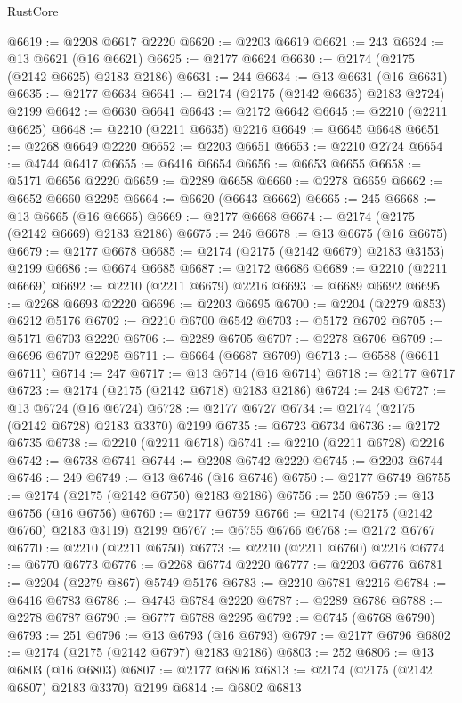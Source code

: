\begin{lexlean}{RustCore}
\begin{coremodule}
@6619 := @2208 @6617 @2220
@6620 := @2203 @6619
@6621 := 243
@6624 := @13 @6621 (@16 @6621)
@6625 := @2177 @6624
@6630 := @2174 (@2175 (@2142 @6625) @2183 @2186)
@6631 := 244
@6634 := @13 @6631 (@16 @6631)
@6635 := @2177 @6634
@6641 := @2174 (@2175 (@2142 @6635) @2183 @2724) @2199
@6642 := @6630 @6641
@6643 := @2172 @6642
@6645 := @2210 (@2211 @6625)
@6648 := @2210 (@2211 @6635) @2216
@6649 := @6645 @6648
@6651 := @2268 @6649 @2220
@6652 := @2203 @6651
@6653 := @2210 @2724
@6654 := @4744 @6417
@6655 := @6416 @6654
@6656 := @6653 @6655
@6658 := @5171 @6656 @2220
@6659 := @2289 @6658
@6660 := @2278 @6659
@6662 := @6652 @6660 @2295
@6664 := @6620 (@6643 @6662)
@6665 := 245
@6668 := @13 @6665 (@16 @6665)
@6669 := @2177 @6668
@6674 := @2174 (@2175 (@2142 @6669) @2183 @2186)
@6675 := 246
@6678 := @13 @6675 (@16 @6675)
@6679 := @2177 @6678
@6685 := @2174 (@2175 (@2142 @6679) @2183 @3153) @2199
@6686 := @6674 @6685
@6687 := @2172 @6686
@6689 := @2210 (@2211 @6669)
@6692 := @2210 (@2211 @6679) @2216
@6693 := @6689 @6692
@6695 := @2268 @6693 @2220
@6696 := @2203 @6695
@6700 := @2204 (@2279 @853) @6212 @5176
@6702 := @2210 @6700 @6542
@6703 := @5172 @6702
@6705 := @5171 @6703 @2220
@6706 := @2289 @6705
@6707 := @2278 @6706
@6709 := @6696 @6707 @2295
@6711 := @6664 (@6687 @6709)
@6713 := @6588 (@6611 @6711)
@6714 := 247
@6717 := @13 @6714 (@16 @6714)
@6718 := @2177 @6717
@6723 := @2174 (@2175 (@2142 @6718) @2183 @2186)
@6724 := 248
@6727 := @13 @6724 (@16 @6724)
@6728 := @2177 @6727
@6734 := @2174 (@2175 (@2142 @6728) @2183 @3370) @2199
@6735 := @6723 @6734
@6736 := @2172 @6735
@6738 := @2210 (@2211 @6718)
@6741 := @2210 (@2211 @6728) @2216
@6742 := @6738 @6741
@6744 := @2208 @6742 @2220
@6745 := @2203 @6744
@6746 := 249
@6749 := @13 @6746 (@16 @6746)
@6750 := @2177 @6749
@6755 := @2174 (@2175 (@2142 @6750) @2183 @2186)
@6756 := 250
@6759 := @13 @6756 (@16 @6756)
@6760 := @2177 @6759
@6766 := @2174 (@2175 (@2142 @6760) @2183 @3119) @2199
@6767 := @6755 @6766
@6768 := @2172 @6767
@6770 := @2210 (@2211 @6750)
@6773 := @2210 (@2211 @6760) @2216
@6774 := @6770 @6773
@6776 := @2268 @6774 @2220
@6777 := @2203 @6776
@6781 := @2204 (@2279 @867) @5749 @5176
@6783 := @2210 @6781 @2216
@6784 := @6416 @6783
@6786 := @4743 @6784 @2220
@6787 := @2289 @6786
@6788 := @2278 @6787
@6790 := @6777 @6788 @2295
@6792 := @6745 (@6768 @6790)
@6793 := 251
@6796 := @13 @6793 (@16 @6793)
@6797 := @2177 @6796
@6802 := @2174 (@2175 (@2142 @6797) @2183 @2186)
@6803 := 252
@6806 := @13 @6803 (@16 @6803)
@6807 := @2177 @6806
@6813 := @2174 (@2175 (@2142 @6807) @2183 @3370) @2199
@6814 := @6802 @6813

\end{coremodule}
\end{lexlean}
